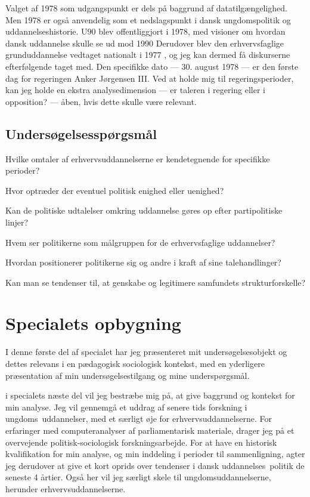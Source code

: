 Valget af 1978 som udgangspunkt er dels på baggrund af datatilgængelighed.
Men 1978 er også anvendelig som et nedslagspunkt i dansk ungdomspolitik og uddannelseshistorie.
U90 blev offentliggjort i 1978, med visioner om hvordan dansk uddannelse skulle se ud mod 1990 \autocite{undervisningsministeriet90SamletUddannelsesplanlaegning1978}
Derudover blev den erhvervsfaglige grunduddannelse vedtaget nationalt i 1977 \autocite{thewikipediavolunteersEFG2019}, og jeg kan dermed få diskurserne efterfølgende taget med.
Den specifikke dato — 30. august 1978 — er den første dag for regeringen Anker Jørgensen III.
Ved at holde mig til regeringsperioder, kan jeg holde en ekstra analysedimension — er taleren i regering eller i opposition? — åben, hvis dette skulle være relevant.

\section{Undersøgelsesspørgsmål}\label{seq:resqs}

Hvilke omtaler af erhvervsuddannelserne er kendetegnende for specifikke perioder?

Hvor optræder der eventuel politisk enighed eller uenighed?

Kan de politiske udtalelser omkring uddannelse gøres op efter partipolitiske linjer?

Hvem ser politikerne som målgruppen for de erhvervsfaglige uddannelser?

Hvordan positionerer politikerne sig og andre i kraft af sine talehandlinger?

Kan man se tendenser til, at genskabe og legitimere samfundets strukturforskelle?

\chapter{Specialets opbygning}
I denne første del af specialet har jeg præsenteret mit undersøgelsesobjekt og dettes relevans i en pædagogisk sociologisk kontekst, med en yderligere præsentation af min undersøgelsestilgang og mine underspørgsmål.

i specialets næste del vil jeg bestræbe mig på, at give baggrund og kontekst for min analyse.
Jeg vil gennemgå et uddrag af senere tids forskning i ungdoms\ uddannelser, med et særligt øje for erhvervsuddannelserne.
For erfaringer med computeranalyser af parliamentarisk materiale, drager jeg på et overvejende politisk-sociologisk forskningsarbejde.
For at have en historisk kvalifikation for min analyse, og min inddeling i perioder til sammenligning, agter jeg derudover at give et kort oprids over tendenser i dansk uddannelses\ politik de seneste 4 årtier.
Også her vil jeg særligt skele til ungdomsuddannelserne, herunder erhvervsuddannelserne.

